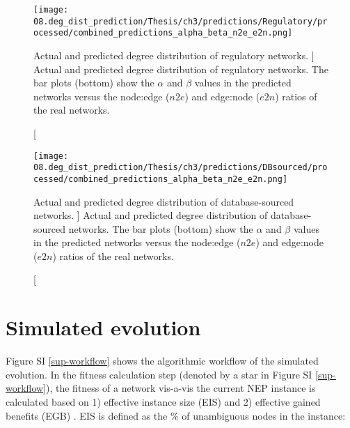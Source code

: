 \documentclass[12pt]{article}	%
\begin{document}
        \begin{figure}[H]%
                \centering
                        \texttt{[image: 08.deg\_dist\_prediction/Thesis/ch3/predictions/Regulatory/processed/combined\_predictions\_alpha\_beta\_n2e\_e2n.png]}
                        \caption
                            [
                                Actual and predicted degree distribution of regulatory networks.
                            ]
                            {
                                Actual and predicted degree distribution of regulatory networks. The bar plots (bottom) show the $\alpha$ and $\beta$ values in the predicted networks versus the node:edge ($n2e$) and edge:node ($e2n$) ratios of the real networks.
                            }
                        \label{fig:predictions_Regulatory}
        \end{figure}

        \begin{figure}[H]%
                \centering
                        \texttt{[image: 08.deg\_dist\_prediction/Thesis/ch3/predictions/DBsourced/processed/combined\_predictions\_alpha\_beta\_n2e\_e2n.png]}
                        \caption
                        [
                            Actual and predicted degree distribution of database-sourced networks.
                        ]
                        {
                            Actual and predicted degree distribution of database-sourced networks. The bar plots (bottom) show the $\alpha$ and $\beta$ values in the predicted networks versus the node:edge ($n2e$) and edge:node ($e2n$) ratios of the real networks.
                        }
                        \label{fig:predictions_DBsourced}
        \end{figure}

\newpage
\section{Simulated evolution}\label{sup_sim_evo}
    Figure SI \ref{sup-workflow} shows the algorithmic workflow of the simulated evolution. In the fitness calculation step (denoted by a star in Figure SI  \ref{sup-workflow}), the fitness of a network vis-a-vis the current NEP instance is calculated based on 1) effective instance size (EIS) and 2) effective gained benefits (EGB) \cite{atiia_computational_2017-1}.
    EIS is defined as the \% of unambiguous nodes in the instance:
\end{document}
